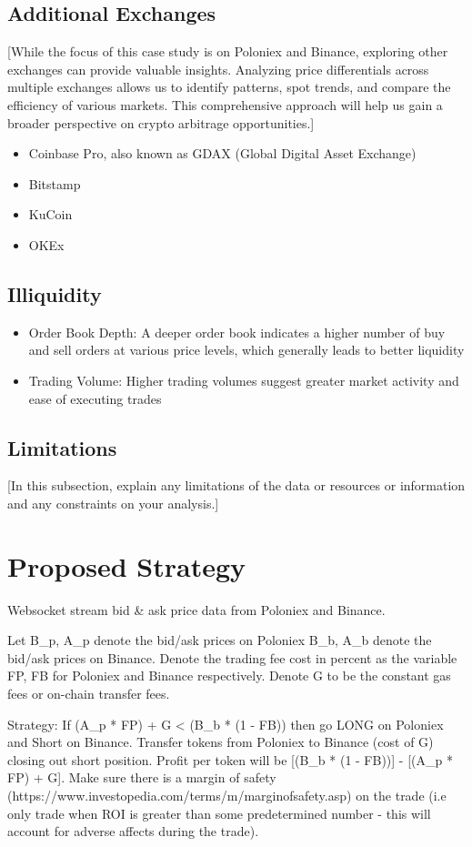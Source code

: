 \documentclass{article}
\begin{document}
\subsection{Additional Exchanges}
[While the focus of this case study is on Poloniex and Binance, exploring other exchanges can provide valuable
insights. Analyzing price differentials across multiple exchanges allows us to identify patterns, spot trends,
and compare the efficiency of various markets. This comprehensive approach will help us gain a broader
perspective on crypto arbitrage opportunities.]
\begin{itemize}
  \item Coinbase Pro, also known as GDAX (Global Digital Asset Exchange)
  \item Bitstamp
  \item KuCoin
  \item OKEx
\end{itemize}
\subsection{Illiquidity}
\begin{itemize}
  \item Order Book Depth: A deeper order book indicates a higher number of buy and sell orders at various price levels, which generally leads to better liquidity
  \item Trading Volume: Higher trading volumes suggest greater market activity and ease of executing trades
\end{itemize}
\subsection{Limitations}
[In this subsection, explain any limitations of the data or resources or information and any constraints on your analysis.]

\section{Proposed Strategy}
Websocket stream bid & ask price data from Poloniex and Binance.

Let B_p, A_p denote the bid/ask prices on Poloniex B_b, A_b denote the bid/ask prices on Binance. Denote the trading fee cost in percent as the variable FP, FB for Poloniex and Binance respectively. Denote G to be the constant gas fees or on-chain transfer fees.

Strategy:
If (A_p * FP) + G < (B_b * (1 - FB)) then go LONG on Poloniex and Short on Binance. Transfer tokens from Poloniex to Binance (cost of G) closing out short position. Profit per token will be [(B_b * (1 - FB))] - [(A_p * FP) + G]. Make sure there is a margin of safety (https://www.investopedia.com/terms/m/marginofsafety.asp) on the trade (i.e only trade when ROI is greater than some predetermined number - this will account for adverse affects during the trade).
\end{document}
